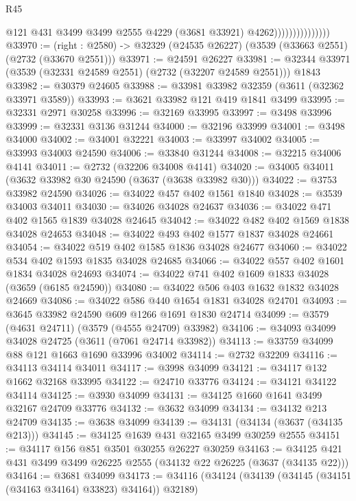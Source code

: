 \begin{lexlean}{R45}
\begin{coremodule}
                                  @121
                                  @431
                                  @3499
                                  @3499
                                  @2555
                                  @4229
                                  (@3681 @33921)
                                  @4262)))))))))))))))
@33970 := (right : @2580) -> @32329 (@24535 @26227) (@3539 (@33663 @2551) (@2732 (@33670 @2551)))
@33971 := @24591 @26227
@33981 := @32344 @33971 (@3539 (@32331 @24589 @2551) (@2732 (@32207 @24589 @2551))) @1843
@33982 := @30379 @24605
@33988 := @33981 @33982 @32359 (@3611 (@32362 @33971 @3589))
@33993 := @3621 @33982 @121 @419 @1841 @3499
@33995 := @32331 @2971 @30258
@33996 := @32169 @33995
@33997 := @3498 @33996
@33999 := @32331 @3136 @31244
@34000 := @32196 @33999
@34001 := @3498 @34000
@34002 := @34001 @32221
@34003 := @33997 @34002
@34005 := @33993 @34003 @24590
@34006 := @33840 @31244
@34008 := @32215 @34006 @4141
@34011 := @2732 (@32206 @34008 @4141)
@34020 := @34005 @34011 (@3632 @33982 @30 @24590 (@3637 (@3638 @33982 @30)))
@34022 := @3753 @33982 @24590
@34026 := @34022 @457 @402 @1561 @1840
@34028 := @3539 @34003 @34011
@34030 := @34026 @34028 @24637
@34036 := @34022 @471 @402 @1565 @1839 @34028 @24645
@34042 := @34022 @482 @402 @1569 @1838 @34028 @24653
@34048 := @34022 @493 @402 @1577 @1837 @34028 @24661
@34054 := @34022 @519 @402 @1585 @1836 @34028 @24677
@34060 := @34022 @534 @402 @1593 @1835 @34028 @24685
@34066 := @34022 @557 @402 @1601 @1834 @34028 @24693
@34074 := @34022 @741 @402 @1609 @1833 @34028 (@3659 (@6185 @24590))
@34080 := @34022 @506 @403 @1632 @1832 @34028 @24669
@34086 := @34022 @586 @440 @1654 @1831 @34028 @24701
@34093 := @3645 @33982 @24590 @609 @1266 @1691 @1830 @24714
@34099 := @3579 (@4631 @24711) (@3579 (@4555 @24709) @33982)
@34106 := @34093 @34099 @34028 @24725 (@3611 (@7061 @24714 @33982))
@34113 := @33759 @34099 @88 @121 @1663 @1690 @33996 @34002
@34114 := @2732 @32209
@34116 := @34113 @34114 @34011
@34117 := @3998 @34099
@34121 := @34117 @132 @1662 @32168 @33995
@34122 := @24710 @33776
@34124 := @34121 @34122 @34114
@34125 := @3930 @34099
@34131 := @34125 @1660 @1641 @3499 @32167 @24709 @33776
@34132 := @3632 @34099
@34134 := @34132 @213 @24709
@34135 := @3638 @34099
@34139 := @34131 (@34134 (@3637 (@34135 @213)))
@34145 := @34125 @1639 @431 @32165 @3499 @30259 @2555
@34151 := @34117 @156 @851 @3501 @30255 @26227 @30259
@34163 := @34125 @421 @431 @3499 @3499 @26225 @2555 (@34132 @22 @26225 (@3637 (@34135 @22)))
@34164 := @3681 @34099
@34173 := @34116 (@34124 (@34139 (@34145 (@34151 (@34163 @34164) @33823) @34164)) @32189)

\end{coremodule}
\end{lexlean}
